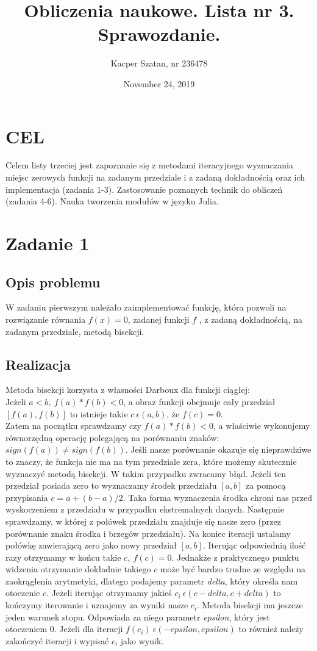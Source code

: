 \documentclass[]{article}
\title{Obliczenia naukowe. Lista nr 3. Sprawozdanie.}
\author{Kacper Szatan, nr 236478}
\date{November 24, 2019}
\begin{document}
\maketitle
\section*{\centering CEL}
Celem listy trzeciej jest zapoznanie się z metodami iteracyjnego wyznaczania miejsc zerowych funkcji na zadanym przedziale i z zadaną dokładnością oraz ich implementacja (zadania 1-3). Zastosowanie poznanych technik do obliczeń (zadania 4-6). Nauka tworzenia modułów w języku Julia.
\section{Zadanie 1}
\subsection{Opis problemu}
W zadaniu pierwszym należało zaimplementować funkcję, która pozwoli na rozwiązanie równania $f(x) = 0$, zadanej funkcji $f$ , z zadaną dokładnością, na zadanym przedziale, metodą bisekcji.
\subsection{Realizacja}
Metoda bisekcji korzysta z własności Darboux dla funkcji ciągłej:\\ Jeżeli $a < b, \: f(a)*f(b)<0$, a obraz funkcji obejmuje cały przedział $[f(a), f(b)]$ to istnieje takie $c \:\epsilon (a, b)$, że $f(c) = 0$. \\
Zatem na początku sprawdzamy czy $f(a)*f(b) < 0$, a właściwie wykonujemy równorzędną operację polegającą na porównaniu znaków: $sign(f(a)) \not= sign(f(b))$. Jeśli nasze porównanie okazuje się nieprawdziwe to znaczy, że funkcja nie ma na tym przedziale zera, które możemy skutecznie wyznaczyć metodą bisekcji. W takim przypadku zwracamy błąd. Jeżeli ten przedział posiada zero to wyznaczamy środek przedziału $[a,b]$ za pomocą przypisania $c = a + (b - a)/2$. Taka forma wyznaczenia środka chroni nas przed wyskoczeniem z przedziału w przypadku ekstremalnych danych. Następnie sprawdzamy, w której z połówek przedziału znajduje się nasze zero (przez porównanie znaku środka i brzegów przedziału). Na koniec iteracji ustalamy połówkę zawierającą zero jako nowy przedział $[a,b]$. Iterując odpowiednią ilość razy otrzymamy w końcu takie $c, \:f(c) = 0$. Jednakże z praktycznego punktu widzenia otrzymanie dokładnie takiego $c$ może być bardzo trudne ze względu na zaokrąglenia arytmetyki, dlatego podajemy parametr \textit{delta}, który określa nam otoczenie $c$. Jeżeli iterując otrzymamy jakieś $c_i \: \epsilon (c-delta, c+delta)$ to kończymy iterowanie i uznajemy za wyniki nasze $c_i$. Metoda bisekcji ma jeszcze jeden warunek stopu. Odpowiada za niego parametr \textit{epsilon}, który jest otoczeniem $0$. Jeżeli dla iteracji $f(c_i) \:\epsilon (-epsilon, epsilon)$ to również należy zakończyć iteracji i wypisać $c_i$ jako wynik.
\end{document}
